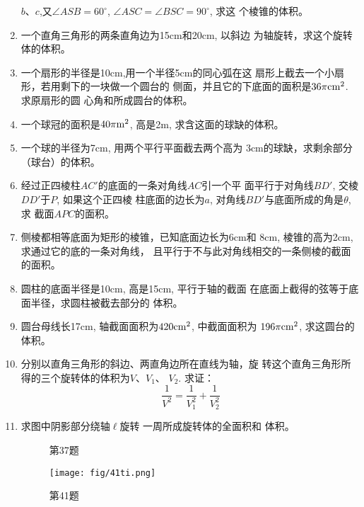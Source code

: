 \begin{enumerate}
$b$、$c$,又$\angle ASB=60^{\circ}$, $\angle ASC=\angle BSC=90^{\circ}$, 求这
个棱锥的体积。
\item 一个直角三角形的两条直角边为15cm和20cm, 以斜边
为轴旋转，求这个旋转体的体积。
\item 一个扇形的半径是10cm,用一个半径5cm的同心弧在这
扇形上截去一个小扇形，若用剩下的一块做一个圆台的
侧面，并且它的下底面的面积是$36\pi {\rm cm^2}$. 求原扇形的圆
心角和所成圆台的体积。
\item 一个球冠的面积是$40\pi {\rm m^2}$, 高是2m, 求含这面的球缺的体积。
\item 一个球的半径为7cm, 用两个平行平面截去两个高为
3cm的球缺，求剩余部分（球台）的体积。
\item 经过正四棱柱$AC'$的底面的一条对角线$AC$引一个平
面平行于对角线$BD'$, 交棱$DD'$于$P$, 如果这个正四棱
柱底面的边长为$a$, 对角线$BD'$与底面所成的角是$\theta$, 求
截面$APC$的面积。
\item 侧棱都相等底面为矩形的棱锥，已知底面边长为6cm和
8cm, 棱锥的高为2cm, 求通过它的底的一条对角线，
且平行于不与此对角线相交的一条侧棱的截面的面积。
\item 圆柱的底面半径是10cm, 高是15cm, 平行于轴的截面
在底面上截得的弦等于底面半径，求圆柱被截去部分的
体积。
\item 圆台母线长17cm, 轴截面面积为$420{\rm cm^2}$, 中截面面积为
$196\pi {\rm cm^2}$, 求这圆台的体积。
\item 分别以直角三角形的斜边、两直角边所在直线为轴，旋
转这个直角三角形所得的三个旋转体的体积为$V$、$V_1$、
$V_2$.
求证：
\[\frac{1}{V^2}=\frac{1}{V^2_1}+\frac{1}{V^2_2}\]
\item 求图中阴影部分绕轴$\ell$旋转
一周所成旋转体的全面积和
体积。

\begin{figure}[htp]\centering
    \begin{minipage}[t]{0.48\textwidth}
    \centering
{}
    \caption*{第37题}
    \end{minipage}
    \begin{minipage}[t]{0.48\textwidth}
    \centering
      \texttt{[image: fig/41ti.png]}
    \caption*{第41题}
    \end{minipage}
    \end{figure}


\end{enumerate}
